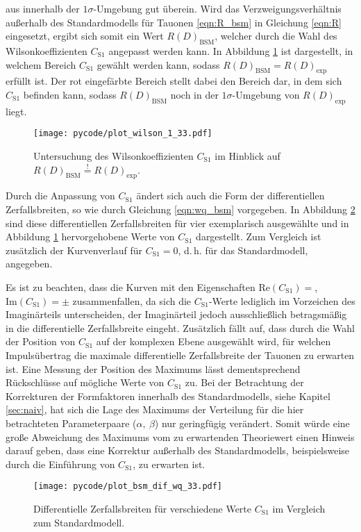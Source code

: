 aus \cite{Hiller2016} innerhalb der $\num{1}\sigma$-Umgebung gut überein.
Wird das Verzweigungsverhältnis außerhalb des Standardmodells für Tauonen \eqref{eqn:R_bsm} in Gleichung \eqref{eqn:R} eingesetzt, ergibt sich somit ein Wert $R(D)_{\text{BSM}}$, welcher durch die Wahl des Wilsonkoeffizienten $C_{\text{S}1}$ angepasst werden kann.
In Abbildung \ref{fig:wilson_1} ist dargestellt, in welchem Bereich $C_{\text{S}1}$ gewählt werden kann, sodass $R(D)_{\text{BSM}} = R(D)_{\text{exp}}$ erfüllt ist.
Der rot eingefärbte Bereich stellt dabei den Bereich dar, in dem sich $C_{\text{S}1}$ befinden kann, sodass $R(D)_{\text{BSM}}$ noch in der $\num{1}\sigma$-Umgebung von $R(D)_{\text{exp}}$ liegt.
\begin{figure}
  \centering
  \texttt{[image: pycode/plot\_wilson\_1\_33.pdf]}
  \caption{Untersuchung des Wilsonkoeffizienten $C_{\text{S}1}$ im Hinblick auf $R(D)_{\text{BSM}} \stackrel{!}{=} R(D)_{\text{exp}}$.}
  \label{fig:wilson_1}
\end{figure}
Durch die Anpassung von $C_{\text{S}1}$ ändert sich auch die Form der differentiellen Zerfallsbreiten, so wie durch Gleichung \eqref{eqn:wq_bsm} vorgegeben.
In Abbildung \ref{fig:wilson_2} sind diese differentiellen Zerfallsbreiten für vier exemplarisch ausgewählte und in Abbildung \ref{fig:wilson_1} hervorgehobene Werte von $C_{\text{S}1}$ dargestellt.
Zum Vergleich ist zusätzlich der Kurvenverlauf für $C_{\text{S}1} = \num{0}$, d.\,h. für das Standardmodell, angegeben.

Es ist zu beachten, dass die Kurven mit den Eigenschaften $\mathrm{Re}(C_{\text{S}1}) = $, $\mathrm{Im}(C_{\text{S}1}) = \pm$ zusammenfallen, da sich die $C_{\text{S}1}$-Werte lediglich im Vorzeichen des Imaginärteils unterscheiden, der Imaginärteil jedoch ausschließlich betragsmäßig in die differentielle Zerfallsbreite eingeht.
Zusätzlich fällt auf, dass durch die Wahl der Position von $C_{\text{S}1}$ auf der komplexen Ebene ausgewählt wird, für welchen Impulsübertrag die maximale differentielle Zerfallsbreite der Tauonen zu erwarten ist.
Eine Messung der Position des Maximums lässt dementsprechend Rückschlüsse auf mögliche Werte von $C_{\text{S}1}$ zu.
Bei der Betrachtung der Korrekturen der Formfaktoren innerhalb des Standardmodells, siehe Kapitel \ref{sec:naiv}, hat sich die Lage des Maximums der Verteilung für die hier betrachteten Parameterpaare ($\alpha,\: \beta$) nur geringfügig verändert.
Somit würde eine große Abweichung des Maximums vom zu erwartenden Theoriewert einen Hinweis darauf geben, dass eine Korrektur außerhalb des Standardmodells, beispielsweise durch die Einführung von $C_{\text{S}1}$, zu erwarten ist.

\begin{figure}
  \centering
  \texttt{[image: pycode/plot\_bsm\_dif\_wq\_33.pdf]}
  \caption{Differentielle Zerfallsbreiten für verschiedene Werte $C_{\text{S}1}$ im Vergleich zum Standardmodell.}
  \label{fig:wilson_2}
\end{figure}
